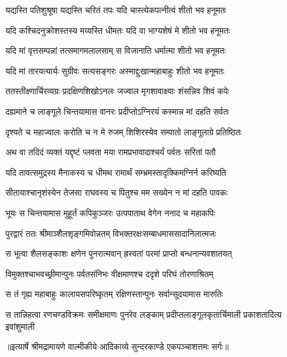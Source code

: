 \twolineshloka
{यद्यस्ति पतिशुश्रूषा यद्यस्ति चरितं तपः}
{यदि चास्त्येकपत्नीत्वं शीतो भव हनूमतः} %

\twolineshloka
{यदि कश्चिदनुक्रोशस्तस्य मय्यस्ति धीमतः}
{यदि वा भाग्यशेषं मे शीतो भव हनूमतः} %

\twolineshloka
{यदि मां वृत्तसम्पन्नां तत्समागमलालसाम्}
{स विजानाति धर्मात्मा शीतो भव हनूमतः} %

\twolineshloka
{यदि मां तारयत्यार्यः सुग्रीवः सत्यसङ्गरः}
{अस्माद्दुःखान्महाबाहुः शीतो भव हनूमतः} %

\twolineshloka
{ततस्तीक्ष्णार्चिरव्यग्रः प्रदक्षिणशिखोऽनलः}
{जज्वाल मृगशावाक्ष्याः शंसन्निव शिवं कपेः} %

\twolineshloka
{दह्यमाने च लाङ्गूले चिन्तयामास वानरः}
{प्रदीप्तोऽग्निरयं कस्मान्न मां दहति सर्वतः} %

\twolineshloka
{दृश्यते च महाज्वालः करोति च न मे रुजम्}
{शिशिरस्येव सम्पातो लाङ्गूलाग्रे प्रतिष्ठितः} %

\twolineshloka
{अथ वा तदिदं व्यक्तं यद्दृष्टं प्लवता मया}
{रामप्रभावादाश्चर्यं पर्वतः सरितां पतौ} %

\twolineshloka
{यदि तावत्समुद्रस्य मैनाकस्य च धीमथ}
{रामार्थं सम्भ्रमस्तादृक्किमग्निर्न करिष्यति} %

\twolineshloka
{सीतायाश्चानृशंस्येन तेजसा राघवस्य च}
{पितुश्च मम सख्येन न मां दहति पावकः} %

\twolineshloka
{भूयः स चिन्तयामास मुहूर्तं कपिकुञ्जरः}
{उत्पपाताथ वेगेन ननाद च महाकपिः} %

\twolineshloka
{पुरद्वारं ततः श्रीमाञ्शैलशृङ्गमिवोन्नतम्}
{विभक्तरक्षःसम्बाधमाससादानिलात्मजः} %

\twolineshloka
{स भूत्वा शैलसङ्काशः क्षणेन पुनरात्मवान्}
{ह्रस्वतां परमां प्राप्तो बन्धनान्यवशातयत्} %

\twolineshloka
{विमुक्तश्चाभवच्छ्रीमान्पुनः पर्वतसंनिभः}
{वीक्षमाणश्च ददृशे परिघं तोरणाश्रितम्} %

\twolineshloka
{स तं गृह्य महाबाहुः कालायसपरिष्कृतम्}
{रक्षिणस्तान्पुनः सर्वान्सूदयामास मारुतिः} %

\fourlineindentedshloka
{स तान्निहत्वा रणचण्डविक्रमः}
{समीक्षमाणः पुनरेव लङ्काम्}
{प्रदीप्तलाङ्गूलकृतार्चिमाली}
{प्रकाशतादित्य इवांशुमाली} %


{॥इत्यार्षे श्रीमद्रामायणे वाल्मीकीये आदिकाव्ये सुन्दरकाण्डे एकपञ्चाशत्तमः सर्गः॥}


